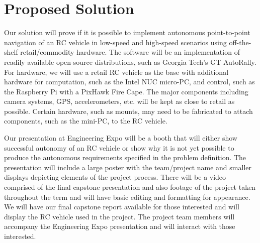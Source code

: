 \documentclass[draftclsnofoot,onecolumn,10pt]{IEEEtran}
\begin{document}
\section{Proposed Solution}
Our solution will prove if it is possible to implement autonomous point-to-point navigation of an RC vehicle in low-speed and high-speed scenarios using off-the-shelf retail/commodity hardware.  
The software will be an implementation of readily available open-source distributions, such as Georgia Tech's GT AutoRally. 
For hardware, we will use a retail RC vehicle as the base with additional hardware for computation, such as the Intel NUC micro-PC, and control, such as the Raspberry Pi with a PixHawk Fire Cape. 
The major components including camera systems, GPS, accelerometers, etc. will be kept as close to retail as possible. 
Certain hardware, such as mounts, may need to be fabricated to attach components, such as the mini-PC, to the RC vehicle.\par
Our presentation at Engineering Expo will be a booth that will either show successful autonomy of an RC vehicle or show why it is not yet possible to produce the autonomous requirements specified in the problem definition. 
The presentation will include a large poster with the team/project name and smaller displays depicting elements of the project process. 
There will be a video comprised of the final capstone presentation and also footage of the project taken throughout the term and will have basic editing and formatting for appearance. 
We will have our final capstone report available for those interested and will display the RC vehicle used in the project. 
The project team members will accompany the Engineering Expo presentation and will interact with those interested.
\end{document}
